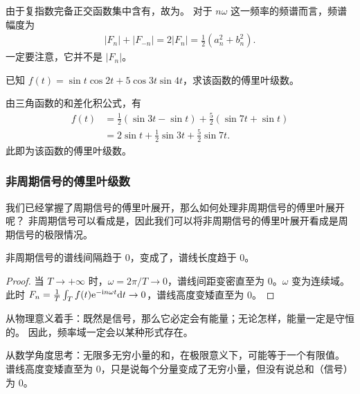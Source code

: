 \begin{note}
    由于复指数完备正交函数集中含有，故为。
    对于 $n\omega$ 这一频率的频谱而言，频谱幅度为
    \begin{align*}
        |F_n| + |F_{-n}| = 2|F_n| = \frac{1}{2}\left(a_n^2 + b_n^2\right).
    \end{align*}
    一定要注意，它并不是 $|F_n|$。
\end{note}

\begin{exercise}
    已知 $f(t) = \sin t\cos 2t + 5\cos 3t \sin 4t$，求该函数的傅里叶级数。
\end{exercise}

\begin{solution}
    由三角函数的和差化积公式，有
    \begin{align*}
        f(t) & = \frac{1}{2}\left(\sin 3t - \sin t\right) + \frac{5}{2}\left(\sin 7t + \sin t\right) \\
        & = 2\sin t + \frac{1}{2}\sin 3t + \frac{5}{2}\sin 7t.
    \end{align*}
    此即为该函数的傅里叶级数。
\end{solution}

\subsubsection{非周期信号的傅里叶级数}

我们已经掌握了周期信号的傅里叶展开，那么如何处理非周期信号的傅里叶展开呢？
非周期信号可以看成是，因此我们可以将非周期信号的傅里叶展开看成是周期信号的极限情况。

\begin{property}[非周期信号频谱性质]
    非周期信号的谱线间隔趋于 $0$，变成了，谱线长度趋于 $0$。
\end{property}

\begin{proof}
    当 $T \to +\infty$ 时，$\omega = 2\pi / T \to 0$，谱线间距变密直至为 $0$。$\omega$ 变为连续域。
    此时
    $F_n = \frac{1}{T}\int_{T}f(t)\mathrm{e}^{-\mathrm{i} n\omega t} \mathrm{d}t \to 0$，谱线高度变矮直至为 $0$。
\end{proof}

\begin{remark}
    从物理意义着手：既然是信号，那么它必定会有能量；无论怎样，能量一定是守恒的。
    因此，频率域一定会以某种形式存在。

    从数学角度思考：无限多无穷小量的和，在极限意义下，可能等于一个有限值。
    谱线高度变矮直至为 $0$，只是说每个分量变成了无穷小量，但没有说总和（信号）为 $0$。
\end{remark}

